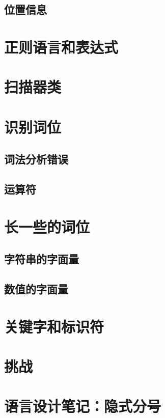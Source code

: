 \documentclass[cn,10pt,math=newtx,citestyle=gb7714-2015,bibstyle=gb7714-2015]{elegantbook}
\begin{document}
\subsection{位置信息}

\section{正则语言和表达式}

\section{扫描器类}

\section{识别词位}

\subsection{词法分析错误}

\subsection{运算符}

\section{长一些的词位}

\subsection{字符串的字面量}

\subsection{数值的字面量}

\section{关键字和标识符}

\section{挑战}

\section{语言设计笔记：隐式分号}
\end{document}
